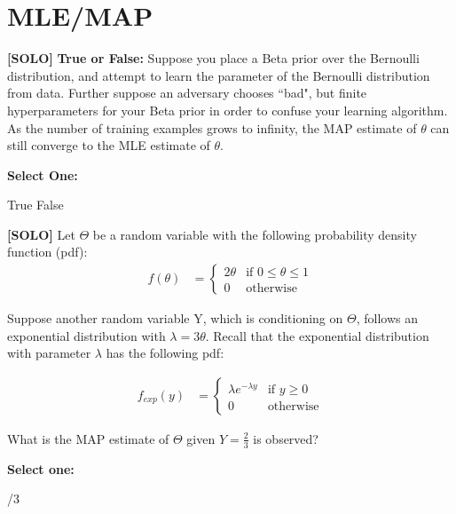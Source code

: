 \documentclass[11pt,addpoints,answers]{exam}
\newcommand{\solo}{\textbf{[SOLO]} }
\begin{document}
\clearpage

\section{MLE/MAP}
\begin{questions}

    \question[3] \solo \textbf{True or False:} Suppose you place a Beta prior over the Bernoulli distribution, and attempt to learn the parameter of the Bernoulli distribution from data. Further suppose an adversary chooses ``bad", but finite hyperparameters for your Beta prior in order to confuse your learning algorithm. As the number of training examples grows to infinity, the MAP estimate of $\theta$ can still converge to the MLE estimate of $\theta$.
    
    \textbf{Select One:}
    
    \begin{checkboxes}
        \choice True
        \choice False
    \end{checkboxes}
    
    
    \question[3] \solo Let $\Theta$ be a random variable with the following probability density function (pdf): 
    \begin{align*}
        f(\theta) &= 
        \begin{cases}
        2\theta  & \text{if } 0 \leq \theta \leq 1 \\
        0  & \text{otherwise}
        \end{cases}
    \end{align*}
    
    Suppose another random variable Y, which is conditioning on $\Theta$, follows an exponential distribution with  $\lambda=3\theta$. Recall that the exponential distribution with parameter $\lambda$ has the following pdf:
    
    
    \begin{align*}
        f_{exp}(y) &= 
        \begin{cases}
        \lambda e^{-\lambda y}  & \text{if } y\geq 0 \\
        0  & \text{otherwise}
        \end{cases}
    \end{align*}
    
    What is the MAP estimate of $\Theta$ given $Y=\frac{2}{3}$ is observed?

    \textbf{Select one:}
    \begin{checkboxes}
        /3
    \end{checkboxes}
    

\end{questions}
\end{document}
